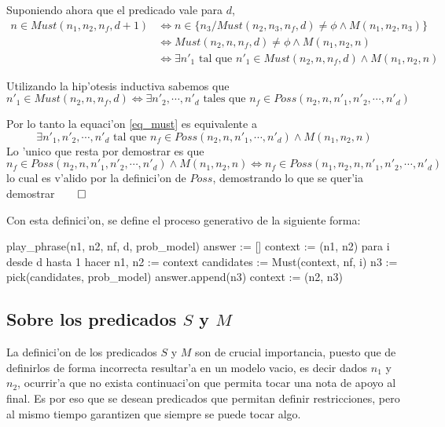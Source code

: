 Suponiendo ahora que el predicado vale para $d$, 
\begin{align}
n \in Must(n_1, n_2, n_f, d+1)   & \Leftrightarrow n \in \{n_3/ Must(n_2, n_3, n_f, d) \neq \phi \land M(n_1,n_2, n_3)\} \nonumber \\
                                 & \Leftrightarrow Must(n_2, n, n_f, d) \neq \phi \land M(n_1,n_2, n) \nonumber \\
                                 & \Leftrightarrow \exists n'_1 \text{ tal que } n'_1 \in Must(n_2, n, n_f, d) \land M(n_1,n_2, n) \label{eq_must}
\end{align}

Utilizando la hip'otesis inductiva sabemos que 
$$  n'_1 \in Must(n_2, n, n_f, d) \Leftrightarrow \exists n'_2, \cdots, n'_{d} \text{ tales que } n_f \in Poss(n_2, n, n'_1, n'_2, \cdots, n'_{d})$$

Por lo tanto la equaci'on \ref{eq_must} es equivalente a
$$ \exists n'_1, n'_2, \cdots, n'_d \text{ tal que } n_f \in Poss(n_2, n, n'_1, \cdots, n'_d) \land M(n_1,n_2, n) $$
Lo 'unico que resta por demostrar es que 
$$ n_f \in Poss(n_2, n, n'_1, n'_2, \cdots, n'_d) \land M(n_1,n_2, n) \Leftrightarrow n_f \in Poss(n_1, n_2, n, n'_1, n'_2, \cdots, n'_d)$$
lo cual es v'alido por la definici'on de $Poss$, demostrando lo que se quer'ia demostrar$\qed$


Con esta definici'on, se define el proceso generativo de la siguiente forma:

\begin{algoritmo}
play_phrase(n1, n2, nf, d, prob_model)
    answer := []
    context := (n1, n2)
    para i desde d hasta 1 hacer
        n1, n2 := context
        candidates := Must(context, nf, i)
        n3 := pick(candidates, prob_model)
        answer.append(n3)
        context := (n2, n3) 
\end{algoritmo}





\subsection{Sobre los predicados $S$ y $M$}
\label{sec:must_predicates}
La definici'on de los predicados $S$ y $M$ son de crucial importancia, puesto que de definirlos de forma incorrecta resultar'a en un modelo vacio, 
es decir dados $n_1$ y $n_2$, ocurrir'a que no exista continuaci'on que permita tocar una nota de apoyo al final. 
Es por eso que se desean predicados que permitan definir restricciones, pero al mismo tiempo garantizen que siempre se puede tocar algo.

